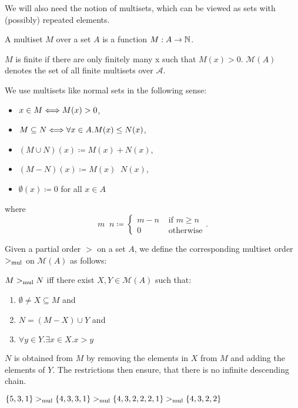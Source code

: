 We will also need the notion of multisets, which can be viewed as sets with (possibly) repeated elements.
\begin{definition*}[Multiset]
	A multiset $M$ over a set $A$ is a function $M : A \to \mathbb{N}$.

	$M$ is finite if there are only finitely many x such that $M(x) > 0$.
	$\mathcal{M}(A)$ denotes the set of all finite multisets over $\mathcal{A}$.
\end{definition*}
\begin{notation}
	We use multisets like normal sets in the following sense:
	\begin{itemize}
		\item $x \in M \logeq M(x) > 0$,
		\item $M \subseteq N \logeq \forall x \in A. M(x) \leq N(x)$,
		\item $(M \cup N)(x) \coloneqq M(x) + N(x)$,
		\item $(M-N)(x) \coloneqq M(x)  \mathop{\dot{-}} N(x)$,
		\item $\emptyset(x) \coloneqq 0$ for all $x \in A$
	\end{itemize}
	where
	\[
		m \mathop{ \dot{-}} n \coloneqq 
		\begin{cases}
			m - n &\text{ if $m \geq n$} \\
			0 &\text{ otherwise}
		\end{cases}
	.\]
\end{notation}
\begin{definition*}
	Given a partial order $>$ on a set $A$, we define the corresponding multiset order
	$>_{\mathit{\text{mul}}}$ on $\mathcal{M}(A)$ as follows:

	$M >_{\mathit{\text{mul}}} N $ iff there exist $X,Y \in \mathcal{M}(A)$ such that:
	\begin{enumerate}
		\item $\emptyset \neq X \subseteq M$ and
		\item $N = (M - X) \cup Y$ and
		\item $\forall y \in Y. \exists x \in X. x > y$
	\end{enumerate}
\end{definition*}
\begin{note}
	$N$ is obtained from $M$ by removing the elements in $X$ from $M$ 
	and adding the elements of $Y$.
	The restrictions then ensure, that there is no infinite descending chain.
\end{note}
\begin{example}
	$\left\{5, 3, 1 \right\} >_{\mathit{\text{mul}}} \left\{ 4, 3, 3, 1 \right\} >_{\mathit{\text{mul}}} \left\{ 4, 3, 2, 2, 2, 1 \right\} >_{\mathit{\text{mul}}} \left\{ 4, 3, 2, 2 \right\}$
\end{example}

